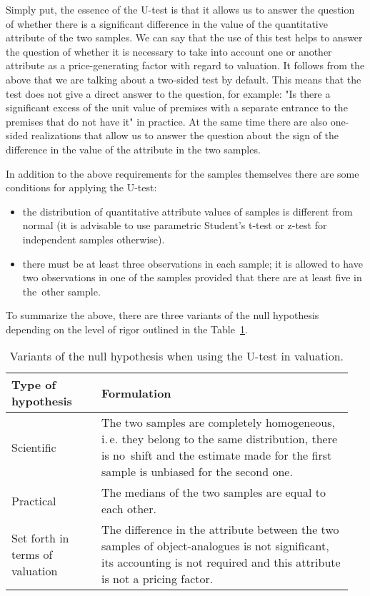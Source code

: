 \documentclass[]{scrreprt}
\begin{document}
Simply put, the essence of the U-test is that it allows us to answer the question of whether there is a significant difference in the value of the quantitative attribute of the two samples. We can say that the use of this test helps to answer the question of whether it is necessary to take into account one or another attribute as a price-generating factor with regard to valuation. It follows from the above that we are talking about a two-sided test by default. This means that the test does not give a direct answer to the question, for example: "Is there a significant excess of the unit value of premises with a separate entrance to the premises that do not have it" in practice. At the same time there are also one-sided realizations that allow us to answer the question about the sign of the difference in the value of the attribute in the two samples.

In addition to the above requirements for the samples themselves there are some conditions for applying the U-test:
\begin{itemize}
	\item the distribution of quantitative attribute values of samples is different from normal (it is advisable to use parametric Student's t-test or z-test for independent samples otherwise).
	\item there must be at least three observations in each sample; it is allowed to have two observations in one of the samples provided that there are at least five in the~other sample.
\end{itemize}
To summarize the above, there are three variants of the null hypothesis depending on the level of rigor outlined in the Table~\ref{tab:nul-hypothesis-variants}.
\begin{table}[htp]
	\caption{Variants of the null hypothesis when using the U-test in valuation.}\label{tab:nul-hypothesis-variants}
	\centering
	\begin{tabularx}{\textwidth}{p{0.25\linewidth} p{0.7\linewidth}} 
		\hline
		Type of hypothesis&Formulation\\
		\hline
		Scientific&The two samples are completely homogeneous, i.\,e. they belong to the same distribution, there is no~shift and the estimate made for the first sample is unbiased for the second one.\\
		\hline
		Practical&The medians of the two samples are equal to each other.\\
		\hline
		Set forth in terms of valuation&The difference in the attribute between the two samples of object-analogues is not significant, its accounting is not required and this attribute is not a pricing factor.\\
		\hline
	\end{tabularx}
\end{table}
%
\end{document}
